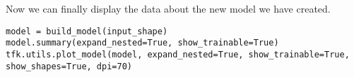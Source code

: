Now we can finally display the data about the new model we have created. 
\begin{lstlisting}[style=Python]
model = build_model(input_shape)
model.summary(expand_nested=True, show_trainable=True)
tfk.utils.plot_model(model, expand_nested=True, show_trainable=True, show_shapes=True, dpi=70)
\end{lstlisting}
